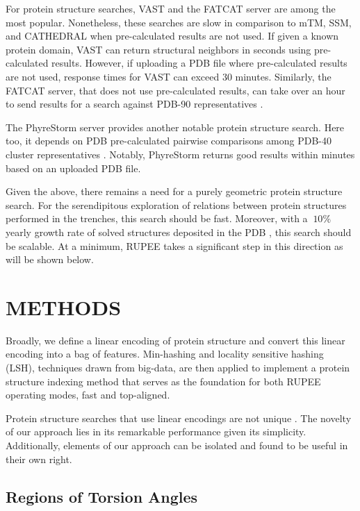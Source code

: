\documentclass[a4,center,fleqn]{NAR}
\begin{document}
For protein structure searches, VAST \cite{Gilbrat1996} and the FATCAT server \cite{Ye2004} are among the most popular. 
Nonetheless, these searches are slow in comparison to mTM, SSM, and CATHEDRAL when pre-calculated results are not used. 
If given a known protein domain, VAST can return structural neighbors in seconds using pre-calculated results. 
However, if uploading a PDB file where pre-calculated results are not used, response times for VAST can exceed 30 minutes. 
Similarly, the FATCAT server, that does not use pre-calculated results, can take over an hour to send results for a search against PDB-90 representatives \cite{Prlic2010}. 

The PhyreStorm server \cite{Mezulis2016} provides another notable protein structure search.
Here too, it depends on PDB pre-calculated pairwise comparisons among PDB-40 cluster representatives \cite{Prlic2010}. 
Notably, PhyreStorm returns good results within minutes based on an uploaded PDB file. 

Given the above, there remains a need for a purely geometric protein structure search.
For the serendipitous exploration of relations between protein structures performed in the trenches, this search should be fast. 
Moreover, with a $~10\%$ yearly growth rate of solved structures deposited in the PDB \cite{gkw1000}, this search should be scalable. 
At a minimum, RUPEE takes a significant step in this direction as will be shown below. 

\section{METHODS}

Broadly, we define a linear encoding of protein structure and convert this linear encoding into a bag of features. 
Min-hashing and locality sensitive hashing (LSH), techniques drawn from big-data, are then applied to implement a protein structure indexing method that serves as the foundation for both RUPEE operating modes, fast and top-aligned. 

Protein structure searches that use linear encodings are not unique \cite{Carpentier2005,Daniluk2011,Ritchie2012}.
The novelty of our approach lies in its remarkable performance given its simplicity. 
Additionally, elements of our approach can be isolated and found to be useful in their own right. 

\subsection{Regions of Torsion Angles}
\end{document}
